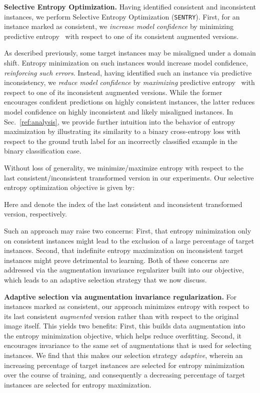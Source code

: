 \documentclass[10pt,twocolumn,letterpaper]{article}
\newcommand{\method}{\texttt{SENTRY}\xspace}
\begin{document}
 
\noindent \textbf{Selective Entropy Optimization.} Having identified consistent and inconsistent instances, we perform Selective Entropy Optimization (\method). 
First, for an instance marked as consistent, we \emph{increase model confidence} by minimizing predictive entropy~\cite{grandvalet2005semi} with respect to one of its consistent augmented versions.

As described previously, some target instances may be misaligned under a domain shift. Entropy minimization on such instances would increase model confidence, \emph{reinforcing such errors}. Instead, having identified such an instance via predictive inconsistency, we \emph{reduce model confidence} by \emph{maximizing} predictive entropy~\cite{pereyra2017regularizing} with respect to one of its inconsistent augmented versions.
While the former encourages confident predictions on highly consistent instances, the latter reduces model confidence on highly inconsistent and likely misaligned instances. In Sec.~\ref{ref:analysis}, we provide further intuition into the behavior of entropy maximization by illustrating its similarity to a binary cross-entropy loss with respect to the ground truth label for an incorrectly classified example in the binary classification case.

Without loss of generality, we minimize/maximize entropy with respect to the last consistent/inconsistent transformed version in our experiments. Our selective entropy optimization objective  is given by:

\vspace{-15pt}


\noindent Here  and  denote the index of the last consistent and inconsistent transformed version, respectively.

Such an approach may raise two concerns: First, that entropy minimization only on consistent instances might lead to the exclusion of a large percentage of target instances. Second, that indefinite entropy maximization on inconsistent target instances might prove detrimental to learning. Both of these concerns are addressed via the augmentation invariance regularizer built into our objective, which leads to an adaptive selection strategy that we now discuss.

\noindent \textbf{Adaptive selection via augmentation invariance regularization.} For instances marked as consistent, our approach minimizes entropy with respect to its last consistent \emph{augmented} version rather than with respect to the original image itself. This yields two benefits: First, this builds data augmentation into the entropy minimization objective, which helps reduce overfitting. Second, it encourages invariance to the same set of augmentations that is used for selecting instances. We find that this makes our selection strategy \emph{adaptive}, wherein an increasing percentage of target instances are selected for entropy minimization over the course of training, and consequently a decreasing percentage of target instances are selected for entropy maximization.
\end{document}
